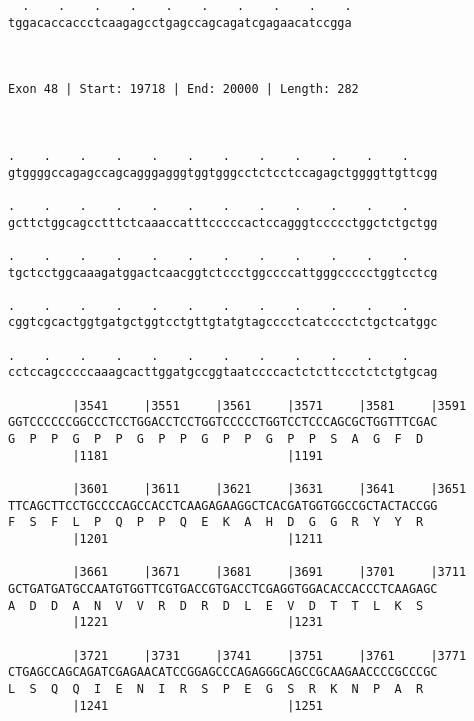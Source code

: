 \documentclass{article}
\begin{document}
\begin{Verbatim}
  .    .    .    .    .    .    .    .    .    .
tggacaccaccctcaagagcctgagccagcagatcgagaacatccgga
                                                
                                                
 
Exon 48 | Start: 19718 | End: 20000 | Length: 282



.    .    .    .    .    .    .    .    .    .    .    .    
gtggggccagagccagcagggagggtggtgggcctctcctccagagctggggttgttcgg
                                                            
.    .    .    .    .    .    .    .    .    .    .    .    
gcttctggcagcctttctcaaaccatttcccccactccagggtccccctggctctgctgg
                                                            
.    .    .    .    .    .    .    .    .    .    .    .    
tgctcctggcaaagatggactcaacggtctccctggccccattgggccccctggtcctcg
                                                            
.    .    .    .    .    .    .    .    .    .    .    .    
cggtcgcactggtgatgctggtcctgttgtatgtagcccctcatcccctctgctcatggc
                                                            
.    .    .    .    .    .    .    .    .    .    .    .    
cctccagcccccaaagcacttggatgccggtaatccccactctcttccctctctgtgcag
                                                            
         |3541     |3551     |3561     |3571     |3581     |3591
GGTCCCCCCGGCCCTCCTGGACCTCCTGGTCCCCCTGGTCCTCCCAGCGCTGGTTTCGAC
G  P  P  G  P  P  G  P  P  G  P  P  G  P  P  S  A  G  F  D  
         |1181                         |1191                
  
         |3601     |3611     |3621     |3631     |3641     |3651
TTCAGCTTCCTGCCCCAGCCACCTCAAGAGAAGGCTCACGATGGTGGCCGCTACTACCGG
F  S  F  L  P  Q  P  P  Q  E  K  A  H  D  G  G  R  Y  Y  R  
         |1201                         |1211                
  
         |3661     |3671     |3681     |3691     |3701     |3711
GCTGATGATGCCAATGTGGTTCGTGACCGTGACCTCGAGGTGGACACCACCCTCAAGAGC
A  D  D  A  N  V  V  R  D  R  D  L  E  V  D  T  T  L  K  S  
         |1221                         |1231                
  
         |3721     |3731     |3741     |3751     |3761     |3771
CTGAGCCAGCAGATCGAGAACATCCGGAGCCCAGAGGGCAGCCGCAAGAACCCCGCCCGC
L  S  Q  Q  I  E  N  I  R  S  P  E  G  S  R  K  N  P  A  R  
         |1241                         |1251                
  

\end{Verbatim}
\end{document}
